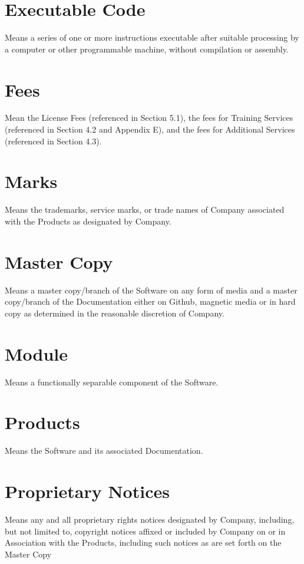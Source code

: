 \documentclass[letterpaper,10pt,english]{sphinxmanual}
\begin{document}
\section{Executable Code}
\label{\detokenize{definitions:executable-code}}
Means a series of one or more instructions executable after suitable processing by a computer or other programmable machine, without compilation or assembly.


\section{Fees}
\label{\detokenize{definitions:fees}}
Mean the License Fees (referenced in Section 5.1), the fees for Training Services (referenced in Section 4.2 and Appendix E), and the fees for Additional Services (referenced in Section 4.3).


\section{Marks}
\label{\detokenize{definitions:marks}}
Means the trademarks, service marks, or trade names of Company associated with the Products as designated by Company.


\section{Master Copy}
\label{\detokenize{definitions:master-copy}}
Means a master copy/branch of the Software on any form of media and a master copy/branch of the Documentation either on Github, magnetic media or in hard copy as determined in the reasonable discretion of Company.


\section{Module}
\label{\detokenize{definitions:module}}
Means a functionally separable component of the Software.


\section{Products}
\label{\detokenize{definitions:products}}
Means the Software and its associated Documentation.


\section{Proprietary Notices}
\label{\detokenize{definitions:proprietary-notices}}
Means any and all proprietary rights notices designated by Company, including, but not limited to, copyright notices affixed or included by Company on or in Association  with the Products, including such notices as are set forth on the Master Copy
\end{document}
